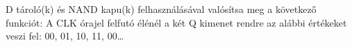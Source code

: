 \begin{example}

D tároló(k) és NAND kapu(k) felhasználásával valósítsa meg a következő funkciót:
A CLK órajel felfutó élénél a két Q kimenet rendre az alábbi értékeket veszi fel: 00, 01, 10, 11, 00…


\tcbline
\vspace{1mm}

\solution

\end{example}
